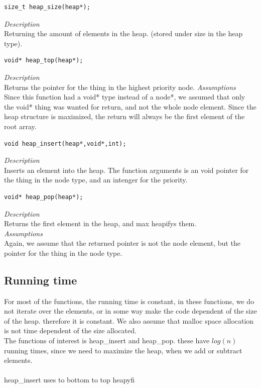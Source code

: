 \documentclass[11pt]{article}
\begin{document}
 \begin{lstlisting}[style=customc]
size_t heap_size(heap*);\end{lstlisting}

\textit{Description}\\
Returning the amount of elements in the heap. (stored under size in the heap type).\\




 \begin{lstlisting}[style=customc]
void* heap_top(heap*);\end{lstlisting}

\textit{Description}\\
Returns the pointer for the thing in the highest priority node.
\textit{Assumptions}\\
Since this function had a void* type instead of a node*, we assumed that only the void* thing was wanted for return, and not the whole node element. Since the heap structure is maximized, the return will always be the first element of the root array.\\


\begin{lstlisting}[style=customc]
void heap_insert(heap*,void*,int); \end{lstlisting}
\textit{Description}\\
Inserts an element into the heap. The function arguments is an void pointer for the thing in the node type, and an intenger for the priority.\\



\begin{lstlisting}[style=customc]
void* heap_pop(heap*);\end{lstlisting}
\textit{Description}\\
Returns the first element in the heap, and max heapifys them.\\
\textit{Assumptions}\\
Again, we assume that the returned pointer is not the node element, but the pointer for the thing in the node type.\\

\subsection{Running time}
For most of the functions, the running time is constant, in these functions, we do not iterate over the elements, or in some way make the code dependent of the size of the heap. therefore it is constant. We also assume that malloc space allocation is not time dependent of the size allocated.
\\
The functions of interest is heap\_insert and heap\_pop. these have $log(n)$ running times, since we need to maximize the heap, when we add or subtract elements.
\\ \\
heap\_insert uses to bottom to top heapyfi
\end{document}
